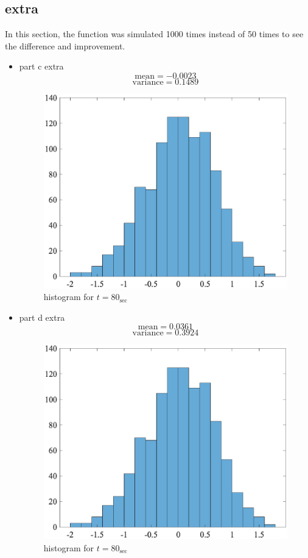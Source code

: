\subsection{extra}
In this section, the function was simulated 1000 times instead of 50 times to see the difference and improvement.
\begin{itemize}
    \item part c extra
    $$
    \text{mean} = -0.0023
    $$
    $$
    \text{variance} = 0.1489
    $$
      \begin{figure}[H] 
      	\caption{histogram for $t = 80_{\sec}$} 
      	\centering 
      	\includegraphics[width=12cm]{../Figure/Q5/extra/histogram_30} 
      \end{figure}
    \item part d extra
    $$
    \text{mean} = 0.0361
    $$
    $$
    \text{variance} = 0.3924
    $$
      \begin{figure}[H] 
      	\caption{histogram for $t = 80_{\sec}$} 
      	\centering 
      	\includegraphics[width=12cm]{../Figure/Q5/extra/histogram_80} 
      \end{figure}
\end{itemize}